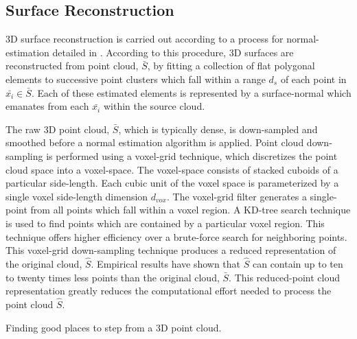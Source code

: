 		\subsection{Surface Reconstruction}

			3D surface reconstruction is carried out according to a process for normal-estimation detailed in \cite{Rusu2009}. According to this procedure, 3D surfaces are reconstructed from point cloud, $\bar{S}$, by fitting a collection of flat polygonal elements to successive point clusters which fall within a range $d_{s}$ of each point in $\bar{x_{i}}\in\bar{S}$. Each of these estimated elements is represented by a surface-normal which emanates from each $\bar{x_{i}}$ within the source cloud.

			The raw 3D point cloud, $\bar{S}$, which is typically dense, is down-sampled and smoothed before a normal estimation algorithm is applied. Point cloud down-sampling is performed using a voxel-grid technique, which discretizes the point cloud space into a voxel-space. The voxel-space consists of stacked cuboids of a particular side-length. Each cubic unit of the voxel space is parameterized by a single voxel side-length dimension $d_{vox}$. The voxel-grid filter generates a single-point from all points which fall within a voxel region. A KD-tree search technique is used to find points which are contained by a particular voxel region. This technique offers higher efficiency over a brute-force search for neighboring points. This voxel-grid down-sampling technique produces a reduced representation of the original cloud, $\hat{S}$. Empirical results have shown that $\hat{S}$ can contain up to ten to twenty times less points than the original cloud, $\bar{S}$. This reduced-point cloud representation greatly reduces the computational effort needed to process the point cloud $\hat{S}$.
			
			\begin{algorithm}
				\begin{algorithmic}
						\EndIf
					\EndFor
				\end{algorithmic}	
				\caption{Finding good places to step from a 3D point cloud.}
				\label{alg::goodspacestostep}
			\end{algorithm}

